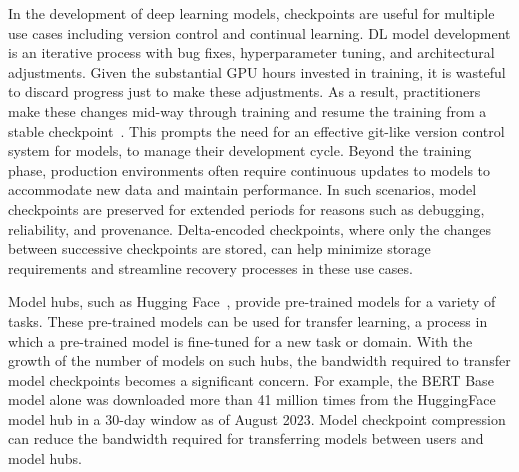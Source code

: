  In the development of deep learning models, checkpoints  are useful for multiple use cases including version control and continual learning. DL model development is an iterative process with bug fixes, hyperparameter tuning, and architectural adjustments. Given the substantial GPU hours invested in training, it is wasteful to discard progress just to make these adjustments. As a result, practitioners make these changes mid-way through training and resume the training from a stable checkpoint~\cite{opt-logbook}. This prompts the need for an effective git-like version control system for models, to manage their development cycle. Beyond the training phase, production environments often require continuous updates to models to accommodate new data and maintain performance. In such scenarios, model checkpoints are preserved for extended periods for reasons such as debugging, reliability, and provenance. Delta-encoded checkpoints, where only the changes between successive checkpoints are stored, can help minimize storage requirements and streamline recovery processes in these use cases.



 Model hubs, such as Hugging Face~\cite{huggingface}, provide pre-trained models for a variety of tasks. These pre-trained models can be used for transfer learning, a  process in which a pre-trained model is fine-tuned for a new task or domain. With the growth of the number of models on such hubs, the bandwidth required to transfer model checkpoints becomes a significant concern. For example, the BERT Base \cite{bert} model alone was downloaded more than 41 million times from the HuggingFace model hub \cite{hf-bert} in a 30-day window as of August 2023. Model checkpoint compression can reduce the bandwidth required for transferring models between users and model hubs.








